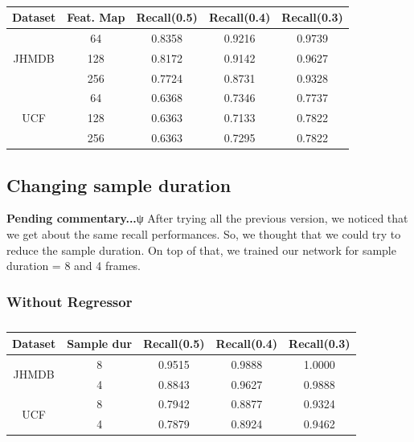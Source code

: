 
\begin{table}[h]
  \centering
  \begin{tabular}{||c | c || c  c  c||}
    \hline
    \textbf{Dataset}  & \textbf{Feat. Map} & \textbf{Recall(0.5)} & \textbf{Recall(0.4)} & \textbf{Recall(0.3)}\\
    \hline
    \multirow{3}{*}{JHMDB} & 64 & 0.8358 & 0.9216 & 0.9739\\
    \cline{2-5}
    {} & 128 & 0.8172 & 0.9142 & 0.9627 \\
    \cline{2-5}
    {} & 256 & 0.7724 & 0.8731 & 0.9328 \\
    \hline
    \multirow{3}{*}{UCF} & 64 & 0.6368 & 0.7346 & 0.7737 \\ 
    \cline{2-5}
    {} & 128 & 0.6363 & 0.7133 & 0.7822 \\
    \cline{2-5}
    {} & 256 &  0.6363 & 0.7295 & 0.7822 \\
    \hline

  \end{tabular}
  \caption{}
  \label{table:reg_2_2}
\end{table}


\subsection{Changing sample duration}
\textbf{Pending commentary...}ψ
After trying all the previous version, we noticed that we get about the same recall performances. So, we thought that we could try
to reduce the sample duration. On top of that, we trained our network for sample duration = 8 and 4 frames.

\subsubsection{Without Regressor}

\begin{table}[h]
  \centering
  \begin{tabular}{|c | c || c c c|}
    \hline
    \textbf{Dataset} & \textbf{Sample dur} & \textbf{Recall(0.5)} &  \textbf{Recall(0.4)} &  \textbf{Recall(0.3)} \\
    \hline
    \multirow{2}{*}{JHMDB} & 8 & 0.9515 & 0.9888 & 1.0000 \\
    \cline{2-5}
    {} & 4 & 0.8843 & 0.9627 & 0.9888 \\
    \hline
    \multirow{2}{*}{UCF} & 8 & 0.7942 & 0.8877 & 0.9324\\
    \cline{2-5}
    {} & 4 & 0.7879 & 0.8924 & 0.9462 \\
    \hline
    
  \end{tabular}
  \caption{}
  \label{table:new_sample}
\end{table}

